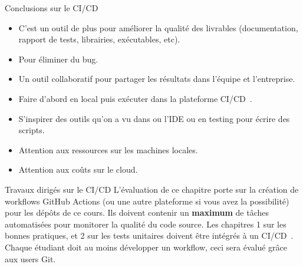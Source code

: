 \documentclass{beamer}
\begin{document}
    \begin{frame}{Conclusions sur le CI/CD}
        \transdissolve
        \begin{itemize}
            \item C'est un outil de plus pour améliorer la qualité des livrables (documentation, rapport de tests, librairies, exécutables, etc).
            \item Pour éliminer du bug.
            \item Un outil collaboratif pour partager les résultats dans l'équipe et l'entreprise.
            \item Faire d'abord en local puis exécuter dans la plateforme CI/CD~.
            \item S'inspirer des outils qu'on a vu dans ou l'IDE ou en testing pour écrire des scripts.
            \item Attention aux ressources sur les machines locales.
            \item Attention aux coûts sur le cloud.
        \end{itemize}
    \end{frame}

    \begin{frame}{Travaux dirigés sur le CI/CD}
        \transdissolve
        L'évaluation de ce chapitre porte sur la création de workflows GitHub Actions (ou une autre plateforme si vous avez la possibilité) pour les dépôts de ce cours.
        \bigbreak
        Ils doivent contenir un \textbf{maximum} de tâches automatisées pour monitorer la qualité du code source.
        \bigbreak
        Les chapitres 1 sur les bonnes pratiques, et 2 sur les tests unitaires doivent être intégrés à un CI/CD~.
        \bigbreak
        Chaque étudiant doit au moins développer un workflow, ceci sera évalué grâce aux users Git.
    \end{frame}
\end{document}
